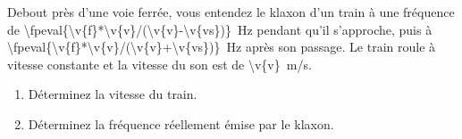 Debout près d'une voie ferrée, vous entendez le klaxon d'un train à une fréquence de \qty[round-mode=places,round-precision=1]{\fpeval{\v{f}*\v{v}/(\v{v}-\v{vs})}}{Hz} pendant qu'il s'approche, puis à \qty[round-mode=places,round-precision=1]{\fpeval{\v{f}*\v{v}/(\v{v}+\v{vs})}}{Hz} après son passage. Le train roule à vitesse constante et la vitesse du son est de \qty{\v{v}}{m/s}.

\begin{enumerate}[label=\alph*)]
    \item Déterminez la vitesse du train.
    \item Déterminez la fréquence réellement émise par le klaxon.
\end{enumerate}
